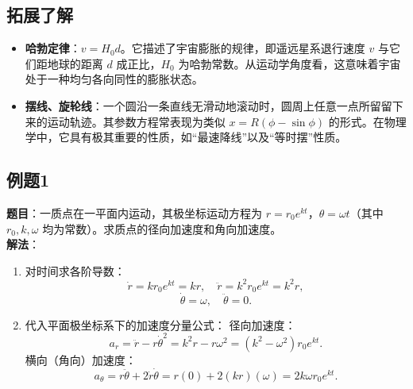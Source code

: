 \documentclass[UTF8]{ctexart}
\begin{document}
	\subsection*{拓展了解}
	\begin{itemize}
		\item \textbf{哈勃定律}：$v = H_0 d$。它描述了宇宙膨胀的规律，即遥远星系退行速度 $v$ 与它们距地球的距离 $d$ 成正比，$H_0$ 为哈勃常数。从运动学角度看，这意味着宇宙处于一种均匀各向同性的膨胀状态。
		\item \textbf{摆线、旋轮线}：一个圆沿一条直线无滑动地滚动时，圆周上任意一点所留留下来的运动轨迹。其参数方程常表现为类似 $x = R(\phi - \sin\phi)$ 的形式。在物理学中，它具有极其重要的性质，如“最速降线”以及“等时摆”性质。
	\end{itemize}
	
	\subsection*{例题1}
	\textbf{题目}：一质点在一平面内运动，其极坐标运动方程为 $r = r_0 e^{kt}$，$\theta = \omega t$（其中 $r_0, k, \omega$ 均为常数）。求质点的径向加速度和角向加速度。\\
	\textbf{解法}：
	\begin{enumerate}
		\item 对时间求各阶导数：
		\[
		\dot{r} = k r_0 e^{kt} = kr,\quad \ddot{r} = k^2 r_0 e^{kt} = k^2 r,
		\]
		\[
		\dot{\theta} = \omega,\quad \ddot{\theta} = 0.
		\]
		\item 代入平面极坐标系下的加速度分量公式：
		径向加速度：
		\[
		a_r = \ddot{r} - r\dot{\theta}^2 = k^2 r - r\omega^2 = (k^2 - \omega^2)r_0 e^{kt}.
		\]
		横向（角向）加速度：
		\[
		a_\theta = r\ddot{\theta} + 2\dot{r}\dot{\theta} = r(0) + 2(kr)(\omega) = 2k\omega r_0 e^{kt}.
		\]
	\end{enumerate}
	
\end{document}
